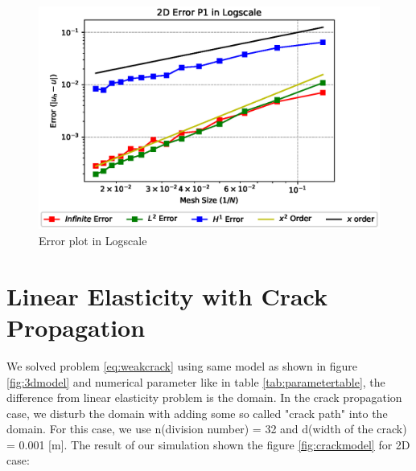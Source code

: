 \documentclass[a4paper,11pt]{article}
\begin{document}
\begin{figure}[h!]
	\centering
	\includegraphics[width=0.5\linewidth]{picture/conference/sincantilever-error}
	\caption{Error plot in Logscale}
	\label{fig:sincantilever-error}
\end{figure}

\newpage
\section{Linear Elasticity with Crack Propagation}
We solved problem \eqref{eq:weakcrack} using same model as shown in figure \ref{fig:3dmodel} and numerical parameter like in table \ref{tab:parametertable}, the difference from linear elasticity problem is the domain. In the crack propagation case, we disturb the domain with adding some so called "crack path" into the domain. For this case, we use n(division number) = 32 and d(width of the crack) = 0.001 [m]. The result of our simulation shown the figure \ref{fig:crackmodel} for 2D case:
\end{document}
